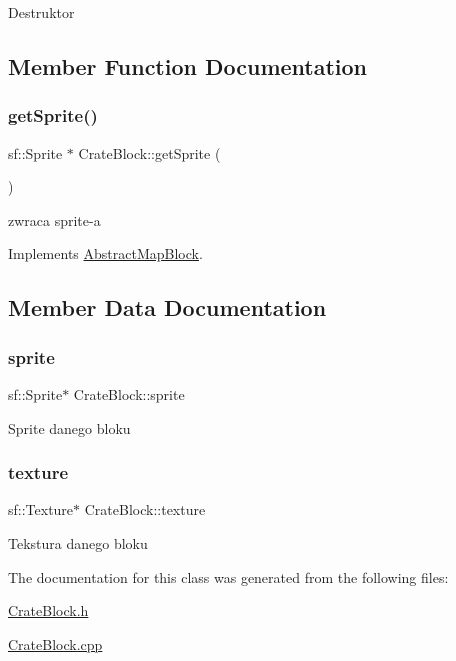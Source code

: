 Destruktor 

\subsection{Member Function Documentation}
\mbox{\label{class_crate_block_a1f478270194247d4e1f7f4b5eb883be9}} 
\subsubsection{\texorpdfstring{get\+Sprite()}{getSprite()}}
{\footnotesize\ttfamily sf\+::\+Sprite $\ast$ Crate\+Block\+::get\+Sprite (\begin{DoxyParamCaption}{ }\end{DoxyParamCaption})\hspace{0.3cm}{\ttfamily [virtual]}}

zwraca sprite-\/a 

Implements \hyperlink{class_abstract_map_block_ab5a448a1b6478d10a8814c6d19c4fdb4}{Abstract\+Map\+Block}.



\subsection{Member Data Documentation}
\mbox{\label{class_crate_block_af4bed3d444d90dad4dd8a10c032c9724}} 
\subsubsection{\texorpdfstring{sprite}{sprite}}
{\footnotesize\ttfamily sf\+::\+Sprite$\ast$ Crate\+Block\+::sprite\hspace{0.3cm}{\ttfamily [protected]}}

Sprite danego bloku \mbox{\label{class_crate_block_a94ec4c6400389af2e8f1cd532c17eb5e}} 
\subsubsection{\texorpdfstring{texture}{texture}}
{\footnotesize\ttfamily sf\+::\+Texture$\ast$ Crate\+Block\+::texture\hspace{0.3cm}{\ttfamily [protected]}}

Tekstura danego bloku 

The documentation for this class was generated from the following files\+:\begin{DoxyCompactItemize}
\item 
\hyperlink{_crate_block_8h}{Crate\+Block.\+h}\item 
\hyperlink{_crate_block_8cpp}{Crate\+Block.\+cpp}\end{DoxyCompactItemize}
